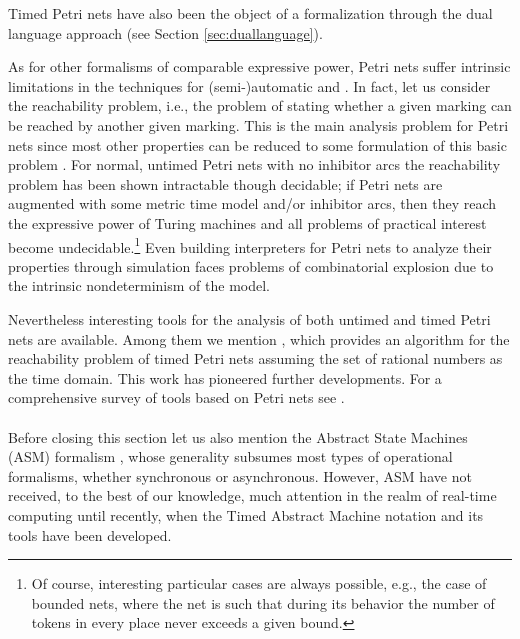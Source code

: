 Timed Petri nets have also been the object of a formalization through 
the dual language approach (see Section \ref{sec:duallanguage}).

As for other formalisms of comparable expressive power, Petri nets
suffer intrinsic limitations in the techniques for (semi-)automatic
 and . In fact, let us consider the reachability
problem, i.e., the problem of stating whether a given marking can be
reached by another given marking. This is the main analysis problem
for Petri nets since most other properties can be reduced to some
formulation of this basic problem \cite{Pet81}. For normal, untimed
Petri nets with no inhibitor arcs the reachability problem has been
shown intractable though decidable; if Petri nets are augmented with
some metric time model and/or inhibitor arcs, then they reach the
expressive power of Turing machines and all problems of practical
interest become undecidable.\footnote{Of course, interesting
  particular cases are always possible, e.g., the case of bounded
  nets, where the net is such that during its behavior the number of
  tokens in every place never exceeds a given bound.} Even building
interpreters for Petri nets to analyze their properties through
simulation faces problems of combinatorial explosion due to the
intrinsic nondeterminism of the model.

Nevertheless interesting tools for the analysis of both untimed and
timed Petri nets are available. Among them we mention \cite{BD91},
which provides an algorithm for the reachability problem of timed
Petri nets assuming the set of rational numbers as the time
domain. This work has pioneered further developments. For a
comprehensive survey of tools based on Petri nets see \cite{TGI}.



\paragraph{}
Before closing this section let us also mention the Abstract State
Machines (ASM) formalism \cite{BS03}, whose generality subsumes most
types of operational formalisms, whether synchronous or
asynchronous. However, ASM have not received, to the best of our
knowledge, much attention in the realm of real-time computing until
recently, when the Timed Abstract Machine notation \cite{OL07} and
its tools \cite{OL07b} have been developed.






